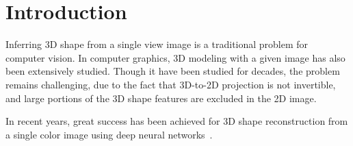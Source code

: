 \section{Introduction}
Inferring 3D shape from a single view image is a traditional problem for computer vision. In computer graphics, 3D modeling with a given image has also been extensively studied. Though it have been studied for decades, the problem remains challenging, due to the fact that 3D-to-2D projection is not invertible, and large portions of the 3D shape features are excluded in the 2D image.

In recent years, great success has been achieved for 3D shape reconstruction from a single color image using deep neural networks~\cite{3DR2N2,PSGN}. 





